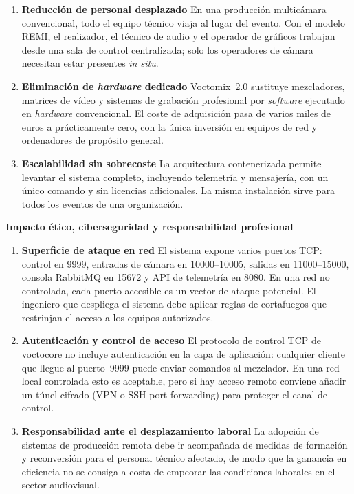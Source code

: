 \begin{enumerate}
  \item \textbf{Reducción de personal desplazado} En una producción multicámara convencional,
  todo el equipo técnico viaja al lugar del evento. Con el modelo REMI, el realizador, el técnico
  de audio y el operador de gráficos trabajan desde una sala de control centralizada; solo los
  operadores de cámara necesitan estar presentes \textit{in situ}.

  \item \textbf{Eliminación de \textit{hardware} dedicado} Voctomix~2.0 sustituye mezcladores, matrices
  de vídeo y sistemas de grabación profesional por \textit{software} ejecutado en \textit{hardware} convencional. El
  coste de adquisición pasa de varios miles de euros a prácticamente cero, con la única inversión
  en equipos de red y ordenadores de propósito general.

  \item \textbf{Escalabilidad sin sobrecoste} La arquitectura contenerizada permite levantar el
  sistema completo, incluyendo telemetría y mensajería, con un único comando y sin licencias
  adicionales. La misma instalación sirve para todos los eventos de una organización.
\end{enumerate}

\vspace{0.15cm}
\textbf{Impacto ético, ciberseguridad y responsabilidad profesional}

\begin{enumerate}
  \item \textbf{Superficie de ataque en red} El sistema expone varios puertos TCP: control en
  9999, entradas de cámara en 10000--10005, salidas en 11000--15000, consola RabbitMQ en 15672 y
  \acs{API} de telemetría en 8080. En una red no controlada, cada puerto accesible es un vector de
  ataque potencial. El ingeniero que despliega el sistema debe aplicar reglas de cortafuegos que
  restrinjan el acceso a los equipos autorizados.

  \item \textbf{Autenticación y control de acceso} El protocolo de control TCP de voctocore no
  incluye autenticación en la capa de aplicación: cualquier cliente que llegue al puerto~9999
  puede enviar comandos al mezclador. En una red local controlada esto es aceptable, pero si hay
  acceso remoto conviene añadir un túnel cifrado (\ac{VPN} o \ac{SSH} port forwarding) para
  proteger el canal de control.

  \item \textbf{Responsabilidad ante el desplazamiento laboral} La adopción de sistemas de
  producción remota debe ir acompañada de medidas de formación y reconversión para el personal
  técnico afectado, de modo que la ganancia en eficiencia no se consiga a costa de empeorar las
  condiciones laborales en el sector audiovisual.
\end{enumerate}

